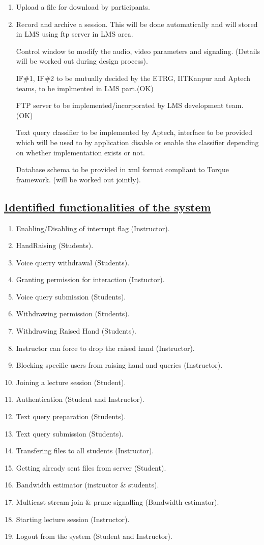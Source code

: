 \documentclass{article}
\begin{document}
\begin{enumerate}
\begin{enumerate}
\item Upload a file for download by participants. 

\item Record and archive a session. This will be done automatically and will stored in LMS using ftp server in LMS area.  

 Control window to modify the audio, video parameters and signaling. (Details will be worked out during design process).
 
 
IF\#1, IF\#2 to be mutually decided by the ETRG, IITKanpur and Aptech teams, to be implmented in LMS part.(OK) 
 
FTP server to be implemented/incorporated by LMS development team. (OK) 
 
Text query classifier to be implemented by Aptech, interface to be provided which will be used to by application disable or enable the classifier depending on whether implementation exists or not.  
 
Database schema to be provided in xml format compliant to Torque framework. (will be worked out jointly). 
\end{enumerate}

\subsection*{\underline{Identified functionalities of the system}}    
\begin{enumerate}      
\item  Enabling/Disabling of interrupt flag (Instructor). 
\item HandRaising (Students). 
\item Voice querry withdrawal (Students). 
\item Granting permission for interaction (Instuctor). 
\item Voice query submission (Students). 
\item Withdrawing permission (Students). 
\item Withdrawing Raised Hand (Students). 
\item Instructor can force to drop the raised hand (Instructor). 
\item Blocking specific users from raising hand and queries (Instructor). 
\item Joining a lecture session (Student). 
\item Authentication (Student and Instructor). 
\item Text query preparation (Students). 
\item Text query submission (Students). 
\item Transfering files to all students (Instructor). 
\item Getting already sent files from server (Student). 
\item Bandwidth estimator (instructor \& students). 
\item  Multicast stream join \& prune signalling (Bandwidth estimator). 
\item  Starting lecture session (Instructor). 
\item Logout from  the system (Student and Instructor).  
 

\end{enumerate}
\end{enumerate}
\end{document}

